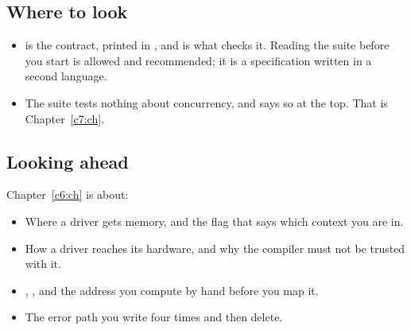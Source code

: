 \subsection*{Where to look}
\begin{itemize}
  \item {} is the contract, printed in , and
     is what checks it. Reading the suite before you start is
    allowed and recommended; it is a specification written in a second language.
  \item The suite tests nothing about concurrency, and says so at the top. That is
    Chapter~\ref{c7:ch}.
\end{itemize}

\subsection*{Looking ahead}
Chapter~\ref{c6:ch} is about:
\begin{itemize}
  \item Where a driver gets memory, and the flag that says which context you are in.
  \item How a driver reaches its hardware, and why the compiler must not be trusted with it.
  \item {}, , and the address you compute by hand before you map it.
  \item The error path you write four times and then delete.
\end{itemize}
